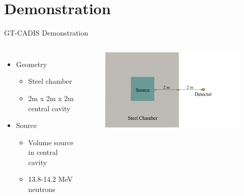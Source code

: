 \documentclass{beamer}
\begin{document}
\section{Demonstration}
\begin{frame}{GT-CADIS Demonstration}
	\begin{columns}
           \begin{itemize}
		   \item{Geometry}
			   \begin{itemize}
				   \item{Steel chamber}
				   \item{2m x 2m x 2m central cavity}
			   \end{itemize}
		   \item{Source}
			   \begin{itemize}
				   \item{Volume source in central cavity}
				   \item{13.8-14.2 MeV neutrons}
			   \end{itemize}
	   \end{itemize}
		\begin{figure}
		\centering
		\includegraphics[scale=0.40]{../../src/figs/orig_geom.png}
                \end{figure}
	\end{columns}
\end{frame}
\end{document}
